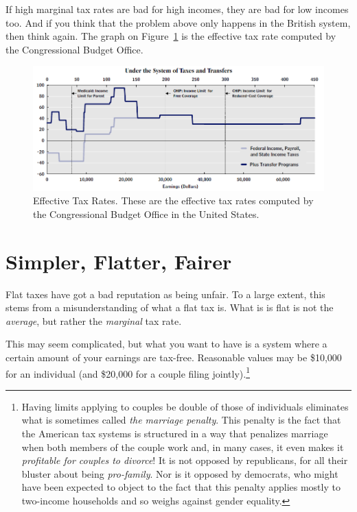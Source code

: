 If high marginal tax rates are bad for high incomes, they are bad for low
incomes too. And if you think that the problem above only happens in the
British system, then think again. The graph on
Figure~\ref{fig:cbo-effective-tax-rate} is the effective tax rate computed by
the Congressional Budget Office.

\begin{figure}
\begin{center}
\includegraphics[width=.8\textwidth]{images/cbo-effective-tax-rate.png}
\end{center}
\caption{Effective Tax Rates. These are the effective tax rates computed by the
Congressional Budget Office in the United States.}
\label{fig:cbo-effective-tax-rate}
\end{figure}

\section{Simpler, Flatter, Fairer}

Flat taxes have got a bad reputation as being unfair. To a large extent, this
stems from a misunderstanding of what a flat tax is. What is is flat is not the
\emph{average}, but rather the \emph{marginal} tax rate.

This may seem complicated, but what you want to have is a system where a
certain amount of your earnings are tax-free. Reasonable values may be \$10,000
for an individual (and \$20,000 for a couple filing jointly).\footnote{Having
limits applying to couples be double of those of individuals eliminates what is
sometimes called \emph{the marriage penalty}. This penalty is the fact that the
American tax systems is structured in a way that penalizes marriage when both
members of the couple work and, in many cases, it even makes it
\emph{profitable for couples to divorce}! It is not opposed by republicans, for
all their bluster about being \emph{pro-family}. Nor is it opposed by
democrats, who might have been expected to object to the fact that this penalty
applies mostly to two-income households and so weighs against gender equality.}

